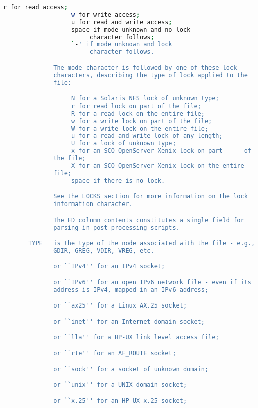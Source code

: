 {{\begin{lstlisting}[language=bash]
                   r for read access;
                   w for write access;
                   u for read and write access;
                   space if mode unknown and no lock
                        character follows;
                   `-' if mode unknown and lock
                        character follows.

              The mode character is followed by one of these lock
              characters, describing the type of lock applied to the
              file:

                   N for a Solaris NFS lock of unknown type;
                   r for read lock on part of the file;
                   R for a read lock on the entire file;
                   w for a write lock on part of the file;
                   W for a write lock on the entire file;
                   u for a read and write lock of any length;
                   U for a lock of unknown type;
                   x for an SCO OpenServer Xenix lock on part      of
              the file;
                   X for an SCO OpenServer Xenix lock on the entire
              file;
                   space if there is no lock.

              See the LOCKS section for more information on the lock
              information character.

              The FD column contents constitutes a single field for
              parsing in post-processing scripts.

       TYPE   is the type of the node associated with the file - e.g.,
              GDIR, GREG, VDIR, VREG, etc.

              or ``IPv4'' for an IPv4 socket;

              or ``IPv6'' for an open IPv6 network file - even if its
              address is IPv4, mapped in an IPv6 address;

              or ``ax25'' for a Linux AX.25 socket;

              or ``inet'' for an Internet domain socket;

              or ``lla'' for a HP-UX link level access file;

              or ``rte'' for an AF_ROUTE socket;

              or ``sock'' for a socket of unknown domain;

              or ``unix'' for a UNIX domain socket;

              or ``x.25'' for an HP-UX x.25 socket;


\end{lstlisting}}}

